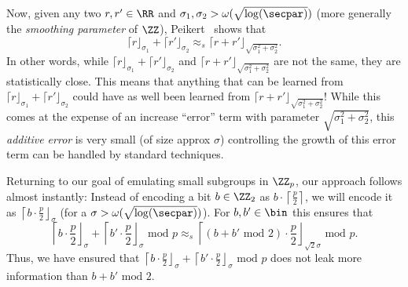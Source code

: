 Now, given any two $r,r' \in \RR$ and $\sigma_1,\sigma_2 > \omega(\sqrt{\log(\secpar)})$ (more generally the \emph{smoothing parameter} of $\ZZ$), Peikert~\cite{C:Peikert10} shows that
\[
\lceil r \rfloor_{\sigma_1} + \lceil r' \rfloor_{\sigma_2} \approx_s \lceil r + r' \rfloor_{\sqrt{\sigma_1^2 + \sigma_2^2}}.
\]
In other words, while $\lceil r \rfloor_{\sigma_1} + \lceil r' \rfloor_{\sigma_2}$ and $\lceil r + r' \rfloor_{\sqrt{\sigma_1^2 + \sigma_2^2}}$ are not the same, they are statistically close. This means that anything that can be learned from $\lceil r \rfloor_{\sigma_1} + \lceil r' \rfloor_{\sigma_2}$ could have as well been learned from $\lceil r + r' \rfloor_{\sqrt{\sigma_1^2 + \sigma_2^2}}$! While this comes at the expense of an increase ``error'' term with parameter $\sqrt{\sigma_1^2 + \sigma_2^2}$, this \emph{additive error} is very small (of size approx $\sigma$) controlling the growth of this error term can be handled by standard techniques.

Returning to our goal of emulating small subgroups in $\ZZ_p$, our approach follows almost instantly: Instead of encoding a bit $b \in \ZZ_2$ as $b \cdot\left \lceil \frac{p}{2} \right\rceil$, we will encode it as $\left\lceil b \cdot \frac{p}{2} \right\rfloor_{\sigma}$ (for a $\sigma > \omega(\sqrt{\log(\secpar)})$). For $b,b' \in \bin$ this ensures that
\[
\left\lceil b \cdot \frac{p}{2} \right\rfloor_{\sigma} + \left\lceil b' \cdot \frac{p}{2}\right \rfloor_{\sigma} \text{ mod } p \approx_s\left \lceil (b + b' \text{ mod } 2) \cdot \frac{p}{2} \right\rfloor_{\sqrt{2} \sigma} \text{ mod } p.
\]
Thus, we have ensured that $\left\lceil b \cdot \frac{p}{2} \right\rfloor_{\sigma} + \left\lceil b' \cdot \frac{p}{2} \right\rfloor_{\sigma} \text{ mod } p$ does not leak more information than $b + b' \text{ mod } 2$.


